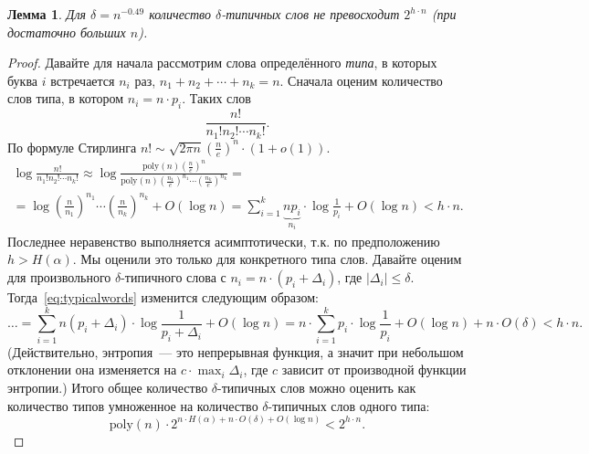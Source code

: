 \documentclass[12pt]{article}
\newcommand{\poly}{\mathrm{poly}}
\theoremstyle{definition}
\theoremstyle{plain}
\newtheorem{lemma}{Лемма}[section]
\theoremstyle{remark}
\begin{document}
\begin{lemma}\label{lm:typicalcount}
    Для $\delta = n^{-0.49}$ количество $\delta$-типичных слов не превосходит
    $2^{h\cdot n}$ (при достаточно больших $n$).
\end{lemma}
\begin{proof}
    Давайте для начала рассмотрим слова определённого \emph{типа}, в которых
    буква $i$ встречается $n_i$ раз, $n_1+n_2+\dotsb + n_k = n$. Сначала оценим
    количество слов типа, в котором $n_i = n\cdot p_i$. Таких слов
    \[
        \frac{n!}{n_1!n_2!\dotsm n_k!}.
    \]
    По формуле Стирлинга $n! \sim \sqrt{2\pi n}\left(\frac{n}{e}\right)^n\cdot(1+o(1)).$
    \begin{multline}\label{eq:typicalwords}
        \log \frac{n!}{n_1!n_2!\dotsm n_k!} \approx 
        \log \frac{\poly(n) \left(\frac{n}{e}\right)^n}
            {\poly(n)\left(\frac{n_1}{e}\right)^{n_1}\dotsm
            \left(\frac{n_k}{e}\right)^{n_k}} = \\
        = \log \left(\frac{n}{n_1}\right)^{n_1}\dotsm
            \left(\frac{n}{n_k}\right)^{n_k} + O(\log n) 
        = \sum_{i=1}^k \underbrace{np_i}_{n_i}\cdot
            \log{\textstyle\frac{1}{p_i}} + O(\log n) < h\cdot n.
    \end{multline}
    Последнее неравенство выполняется асимптотически, т.к. по предположению $h > H(\alpha)$.
    Мы оценили это только для конкретного типа слов. Давайте оценим для
    произвольного $\delta$-типичного слова с $n_i = n\cdot(p_i + \Delta_i)$,
    где $|\Delta_i| \le \delta$. Тогда~\eqref{eq:typicalwords} изменится следующим образом:
    \[    
        \dots = 
        \sum_{i=1}^k n(p_i + \Delta_i)\cdot
            \log{\textstyle\frac{1}{p_i + \Delta_i}} + O(\log n) =         
        n\cdot \sum_{i=1}^k p_i\cdot
            \log{\textstyle\frac{1}{p_i}} + O(\log n) + n\cdot O(\delta) < h\cdot n. 
    \]
    (Действительно, энтропия~--- это непрерывная функция, а значит при небольшом 
    отклонении она изменяется на $c\cdot \max_i\Delta_i$, где $c$ зависит от производной функции энтропии.)
    Итого общее количество $\delta$-типичных слов можно оценить как количество
    типов умноженное на количество $\delta$-типичных слов одного типа:
    \[
        \poly(n) \cdot 2^{n\cdot H(\alpha) + n\cdot O(\delta) + O(\log n)} <
        2^{h\cdot n}.   
    \]
\end{proof}
\end{document}
